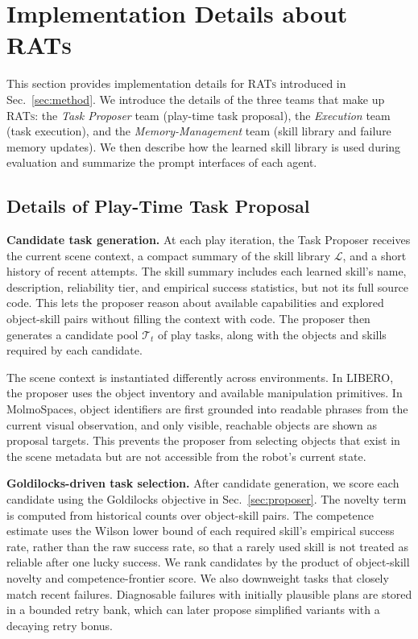 \section{Implementation Details about \textsc{RATs}}
\label{sec:appendix_agent_team}
This section provides implementation details for \textsc{RATs}
introduced in Sec.~\ref{sec:method}. 
We introduce the details of the three teams that make up \textsc{RATs}: the \emph{Task Proposer} team (play-time task proposal), the \emph{Execution} team (task execution), and the \emph{Memory-Management} team (skill library and failure memory updates).
We then describe how the learned skill
library is used during evaluation and summarize the prompt interfaces of each
agent.


\subsection{Details of Play-Time Task Proposal}
\label{sec:appendix_task_proposal}

\textbf{Candidate task generation.}
At each play iteration, the Task Proposer receives the current scene context, a
compact summary of the skill library $\mathcal{L}$, and a short history of
recent attempts. The skill summary includes each learned skill's name,
description, reliability tier, and empirical success statistics, but not its
full source code. This lets the proposer reason about available capabilities
and explored object-skill pairs without filling the context with code. The
proposer then generates a candidate pool $\mathcal{T}_t$ of play tasks, along
with the objects and skills required by each candidate.

The scene context is instantiated differently across environments. In LIBERO,
the proposer uses the object inventory and available manipulation primitives.
In MolmoSpaces, object identifiers are first grounded into readable phrases
from the current visual observation, and only visible, reachable objects are
shown as proposal targets. This prevents the proposer from selecting objects
that exist in the scene metadata but are not accessible from the robot's
current state.

\textbf{Goldilocks-driven task selection.}
After candidate generation, we score each candidate using the Goldilocks
objective in Sec.~\ref{sec:proposer}. The novelty term is computed from
historical counts over object-skill pairs. The competence estimate uses the
Wilson lower bound of each required skill's empirical success rate, rather than
the raw success rate, so that a rarely used skill is not treated as reliable
after one lucky success. We rank candidates by the product of object-skill
novelty and competence-frontier score. We also downweight tasks that closely
match recent failures. Diagnosable failures with initially plausible plans are
stored in a bounded retry bank, which can later propose simplified variants
with a decaying retry bonus.

